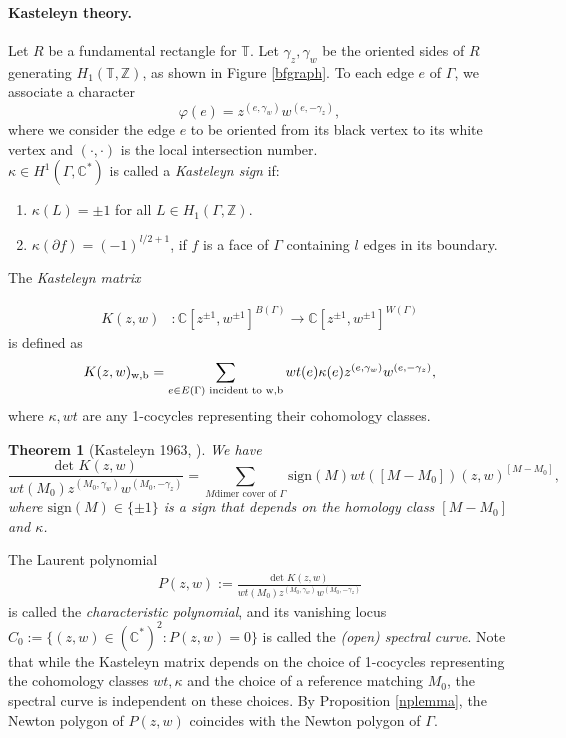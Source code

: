\documentclass[11pt]{article} %
\newtheorem{theorem}{Theorem}[section]
\theoremstyle{definition}
\newcommand{\Z}{{\mathbb Z}}
\newcommand{\C}{{\mathbb C}}
\newcommand{\T}{{\mathbb T}}
\newcommand{\ra}{\rightarrow}
\newcommand{\be}{\begin{equation}}
\newcommand{\ee}{\end{equation}}
\newcommand{\la}{\label}
\begin{document}
\paragraph{Kasteleyn theory.} Let $R$ be a fundamental rectangle for $\T$. Let $\gamma_z,\gamma_w$ be the oriented sides of $R$ generating $H_1(\T,\Z)$, as shown in Figure \ref{bfgraph}. To each edge $e$ of $\Gamma$, we associate a character
\be \la{edgeph}
\varphi(e)=z^{( e,\gamma_w )} w^{(e,-\gamma_z)},
\ee
where we consider the edge $e$ to be oriented from its black vertex to its white vertex and $(\cdot,\cdot)$ is the local intersection number.\\

$\kappa\in H^1(\Gamma,\C^*)$ is called a  \textit{Kasteleyn sign} if:
\begin{enumerate}
    \item $\kappa(L)=\pm 1$ for all $L \in H_1(\Gamma,\Z)$.
    \item $\kappa(\partial f)=(-1)^{l/2+1}$, if $f$ is a face of $\Gamma$ containing $l$ edges in its boundary.
\end{enumerate}
The \textit{Kasteleyn matrix} 

 \begin{align*}  K(z,w)&:\C[z^{\pm 1}, w^{\pm 1}]^{B(\Gamma )} \ra  \C[z^{\pm 1}, w^{\pm 1}]^{W(\Gamma )}
\end{align*}
is defined as 
$$
 K(z,w)_{\text{w}, \text b}=\sum_{e \in E(\Gamma)\text{ incident to } \text w, \text b} wt(e) \kappa(e)z^{( e,\gamma_w )} w^{( e,-\gamma_z)},
$$
where $\kappa, wt$ are any 1-cocycles representing their cohomology classes. 

\begin{theorem}[Kasteleyn 1963, \cite{Kast63}]\label{Kastthm} We have
\[
\frac{\text{det }K(z,w)}{wt(M_0) z^{( M_0,\gamma_w )} w^{( M_0,-\gamma_z)}}= \sum_{M \text{dimer cover of $\Gamma$}} \text{sign}(M)  wt([M-M_0]) (z,w)^{[M-M_0]},
\]
where $\text{sign}(M) \in \{\pm 1\}$ is a sign that depends on the homology class $[M-M_0]$ and $\kappa$.
\end{theorem}
The Laurent polynomial
\begin{align*}
    P(z,w):=\frac{\text{det }K(z,w)}{wt(M_0) z^{( M_0,\gamma_w )} w^{( M_0,-\gamma_z)}}
\end{align*}
is called the \textit{characteristic polynomial}, and its vanishing locus $C_0:=\{(z,w) \in (\C^*)^2: P(z,w)=0\}$ is called the  \textit{(open) spectral curve}. Note that while the Kasteleyn matrix depends on the choice of 1-cocycles representing the cohomology classes $wt,\kappa$ and the choice of a reference matching $M_0$, the spectral curve is independent on these choices. By Proposition \ref{nplemma}, the Newton polygon of $P(z,w)$ coincides with the Newton polygon of $\Gamma$. 
\end{document}
